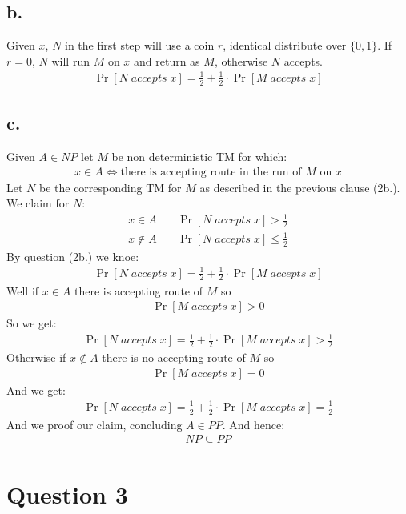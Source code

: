 \documentclass[11pt]{article}
\theoremstyle{plain}
\theoremstyle{nonumberplainnobrackets}
\begin{document}
\subsection*{b.} Given $x$, $N$ in the first step will use a coin $r$, identical distribute over $\{0,1\}$. If $r=0$, $N$ will run $M$ on $x$ and return as $M$, otherwise $N$ accepts.
\begin{align*}
\Pr[N\;accepts\;x]=\frac{1}{2}+\frac{1}{2}\cdot \Pr[M\;accepts\;x]
\end{align*}
\subsection*{c.} Given $A\in NP$ let $M$ be non deterministic TM for which:
\begin{align*}
x\in A \iff \text{there is accepting route in the run of } M \text{ on } x
\end{align*}
Let $N$ be the corresponding TM for $M$ as described in the previous clause (2b.). We claim for $N$: 
\begin{align*}
x\in A&\quad \Pr[N\;accepts\;x]>\frac{1}{2}\\
x\notin A&\quad \Pr[N\;accepts\;x]\le\frac{1}{2}
\end{align*}
By question (2b.) we knoe:
\begin{align*}
\Pr[N\;accepts\;x]= \frac{1}{2}+\frac{1}{2}\cdot \Pr[M\;accepts\;x]
\end{align*}
Well if $x\in A$ there is accepting route of $M$ so
\begin{align*}
 \Pr[M\;accepts\;x] > 0
\end{align*}
So we get:
\begin{align*}
\Pr[N\;accepts\;x]= \frac{1}{2}+\frac{1}{2}\cdot \Pr[M\;accepts\;x] >  \frac{1}{2}
\end{align*}
Otherwise if $x\notin A$ there is no accepting route of $M$ so
\begin{align*}
\Pr[M\;accepts\;x] = 0
\end{align*}
And we get:
\begin{align*}
\Pr[N\;accepts\;x]= \frac{1}{2}+\frac{1}{2}\cdot \Pr[M\;accepts\;x] =  \frac{1}{2}
\end{align*}
And we proof our claim, concluding $A\in PP$. And hence:
\begin{align*}
NP\subseteq PP
\end{align*}



\section*{Question 3}
\end{document}
